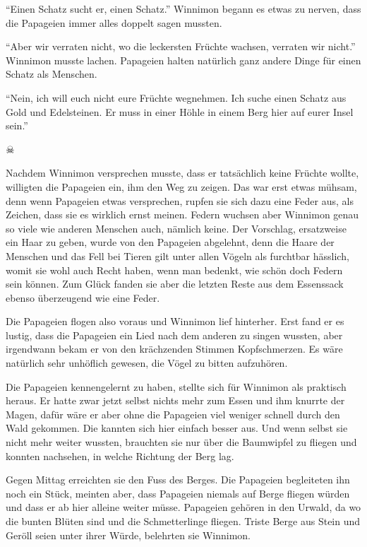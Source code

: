 \enquote{Einen Schatz sucht er, einen Schatz.} Winnimon begann es etwas zu nerven, dass die Papageien immer alles doppelt sagen mussten.

\enquote{Aber wir verraten nicht, wo die leckersten Früchte wachsen, verraten wir nicht.} Winnimon musste lachen. Papageien halten natürlich ganz andere Dinge für einen Schatz als Menschen.

\enquote{Nein, ich will euch nicht eure Früchte wegnehmen. Ich suche einen Schatz aus Gold und Edelsteinen. Er muss in einer Höhle in einem Berg hier auf eurer Insel sein.}

\begin{center}
{ $\skull$}
\end{center}

Nachdem Winnimon versprechen musste, dass er tatsächlich keine Früchte wollte, willigten die Papageien ein, ihm den Weg zu zeigen. Das war erst etwas mühsam, denn wenn Papageien etwas versprechen, rupfen sie sich dazu eine Feder aus, als Zeichen, dass sie es wirklich ernst meinen. Federn wuchsen aber Winnimon genau so viele wie anderen Menschen auch, nämlich keine. Der Vorschlag, ersatzweise ein Haar zu geben, wurde von den Papageien abgelehnt, denn die Haare der Menschen und das Fell bei Tieren gilt unter allen Vögeln als furchtbar hässlich, womit sie wohl auch Recht haben, wenn man bedenkt, wie schön doch Federn sein können. Zum Glück fanden sie aber die letzten Reste aus dem Essenssack ebenso überzeugend wie eine Feder. 

Die Papageien flogen also voraus und Winnimon lief hinterher. Erst fand er es lustig, dass die Papageien ein Lied nach dem anderen zu singen wussten, aber irgendwann bekam er von den krächzenden Stimmen Kopfschmerzen. Es wäre natürlich sehr unhöflich gewesen, die Vögel zu bitten aufzuhören. 

Die Papageien kennengelernt zu haben, stellte sich für Winnimon als praktisch heraus. Er hatte zwar jetzt selbst nichts mehr zum Essen und ihm knurrte der Magen, dafür wäre er aber ohne die Papageien viel weniger schnell durch den Wald gekommen. Die kannten sich hier einfach besser aus. Und wenn selbst sie nicht mehr weiter wussten, brauchten sie nur über die Baumwipfel zu fliegen und konnten nachsehen, in welche Richtung der Berg lag.

Gegen Mittag erreichten sie den Fuss des Berges. Die Papageien begleiteten ihn noch ein Stück, meinten aber, dass Papageien niemals auf Berge fliegen würden und dass er ab hier alleine weiter müsse. Papageien gehören in den Urwald, da wo die bunten Blüten sind und die Schmetterlinge fliegen. Triste Berge aus Stein und Geröll seien unter ihrer Würde, belehrten sie Winnimon.

